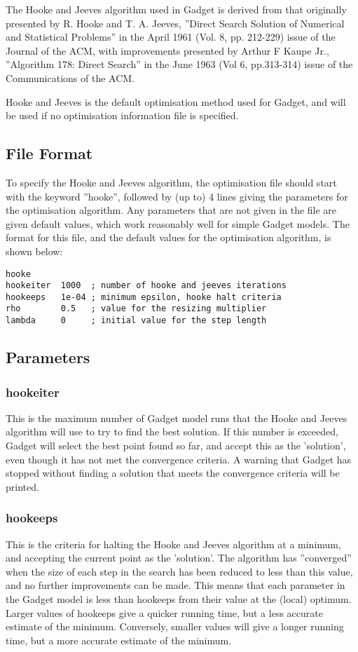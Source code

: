 \documentclass [a4paper, 10pt]{book}
\begin{document}
\bigskip
The Hooke and Jeeves algorithm used in Gadget is derived from that originally presented by R. Hooke and T. A. Jeeves, ''Direct Search Solution of Numerical and Statistical Problems'' in the April 1961 (Vol. 8, pp. 212-229) issue of the Journal of the ACM, with improvements presented by Arthur F Kaupe Jr., ''Algorithm 178: Direct Search'' in the June 1963 (Vol 6, pp.313-314) issue of the Communications of the ACM.

\bigskip
Hooke and Jeeves is the default optimisation method used for Gadget, and will be used if no optimisation information file is specified.

\subsection{File Format}\label{subsec:hookefile}
To specify the Hooke and Jeeves algorithm, the optimisation file should start with the keyword ''hooke'', followed by (up to) 4 lines giving the parameters for the optimisation algorithm.  Any parameters that are not given in the file are given default values, which work reasonably well for simple Gadget models.  The format for this file, and the default values for the optimisation algorithm, is shown below:

{\small\begin{verbatim}
hooke
hookeiter  1000  ; number of hooke and jeeves iterations
hookeeps   1e-04 ; minimum epsilon, hooke halt criteria
rho        0.5   ; value for the resizing multiplier
lambda     0     ; initial value for the step length
\end{verbatim}}

\subsection{Parameters}\label{subsec:hookepar}
\subsubsection{hookeiter}
This is the maximum number of Gadget model runs that the Hooke and Jeeves algorithm will use to try to find the best solution.  If this number is exceeded, Gadget will select the best point found so far, and accept this as the 'solution', even though it has not met the convergence criteria.  A warning that Gadget has stopped without finding a solution that meets the convergence criteria will be printed.

\subsubsection{hookeeps}
This is the criteria for halting the Hooke and Jeeves algorithm at a minimum, and accepting the current point as the 'solution'.  The algorithm has ''converged'' when the size of each step in the search has been reduced to less than this value, and no further improvements can be made.  This means that each parameter in the Gadget model is less than hookeeps from their value at the (local) optimum.  Larger values of hookeeps give a quicker running time, but a less accurate estimate of the minimum.  Conversely, smaller values will give a longer running time, but a more accurate estimate of the minimum.
\end{document}
